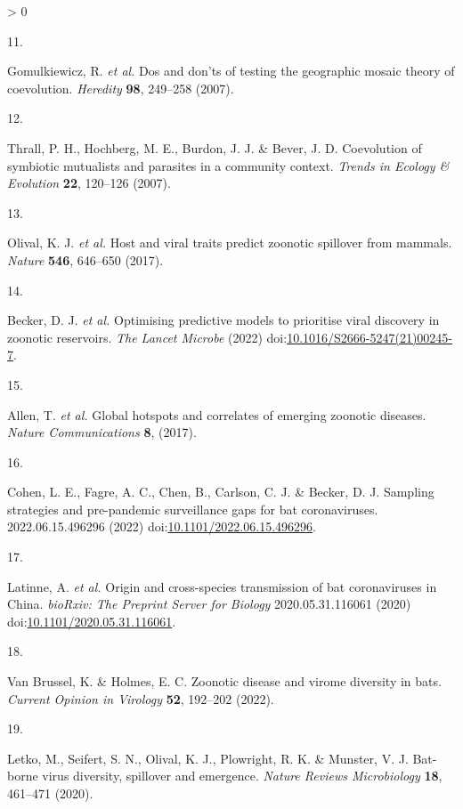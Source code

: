 \documentclass[11pt]{article}
\newlength{\cslhangindent}
\newlength{\csllabelwidth}
\newenvironment{CSLReferences}[3] %
 {%
  \setlength{\parindent}{0pt}
  \ifodd #1 \everypar{\setlength{\hangindent}{\cslhangindent}}\ignorespaces\fi
  \ifnum #2 > 0
  \setlength{\parskip}{#2\baselineskip}
  \fi
 }%
 {}
\newcommand{\CSLLeftMargin}[1]{\parbox[t]{\maxof{\widthof{#1}}{\csllabelwidth}}{#1}}
\newcommand{\CSLRightInline}[1]{\parbox[t]{\linewidth}{#1}}
\begin{document}
\begin{CSLReferences}{0}{0}
\leavevmode\hypertarget{ref-Gomulkiewicz2007DosDon}{}%
\CSLLeftMargin{11. }
\CSLRightInline{Gomulkiewicz, R. \emph{et al.} Dos and don'ts of testing
the geographic mosaic theory of coevolution. \emph{Heredity}
\textbf{98}, 249--258 (2007).}

\leavevmode\hypertarget{ref-Thrall2007CoeSym}{}%
\CSLLeftMargin{12. }
\CSLRightInline{Thrall, P. H., Hochberg, M. E., Burdon, J. J. \& Bever,
J. D. Coevolution of symbiotic mutualists and parasites in a community
context. \emph{Trends in Ecology \& Evolution} \textbf{22}, 120--126
(2007).}

\leavevmode\hypertarget{ref-Olival2017HosVir}{}%
\CSLLeftMargin{13. }
\CSLRightInline{Olival, K. J. \emph{et al.} Host and viral traits
predict zoonotic spillover from mammals. \emph{Nature} \textbf{546},
646--650 (2017).}

\leavevmode\hypertarget{ref-Becker2022OptPre}{}%
\CSLLeftMargin{14. }
\CSLRightInline{Becker, D. J. \emph{et al.} Optimising predictive models
to prioritise viral discovery in zoonotic reservoirs. \emph{The Lancet
Microbe} (2022)
doi:\href{https://doi.org/10.1016/S2666-5247(21)00245-7}{10.1016/S2666-5247(21)00245-7}.}

\leavevmode\hypertarget{ref-Allen2017GloHot}{}%
\CSLLeftMargin{15. }
\CSLRightInline{Allen, T. \emph{et al.} Global hotspots and correlates
of emerging zoonotic diseases. \emph{Nature Communications} \textbf{8},
(2017).}

\leavevmode\hypertarget{ref-Cohen2022SamStr}{}%
\CSLLeftMargin{16. }
\CSLRightInline{Cohen, L. E., Fagre, A. C., Chen, B., Carlson, C. J. \&
Becker, D. J. Sampling strategies and pre-pandemic surveillance gaps for
bat coronaviruses. 2022.06.15.496296 (2022)
doi:\href{https://doi.org/10.1101/2022.06.15.496296}{10.1101/2022.06.15.496296}.}

\leavevmode\hypertarget{ref-Latinne2020OriCro}{}%
\CSLLeftMargin{17. }
\CSLRightInline{Latinne, A. \emph{et al.} Origin and cross-species
transmission of bat coronaviruses in China. \emph{bioRxiv: The Preprint
Server for Biology} 2020.05.31.116061 (2020)
doi:\href{https://doi.org/10.1101/2020.05.31.116061}{10.1101/2020.05.31.116061}.}

\leavevmode\hypertarget{ref-VanBrussel2022ZooDis}{}%
\CSLLeftMargin{18. }
\CSLRightInline{Van Brussel, K. \& Holmes, E. C. Zoonotic disease and
virome diversity in bats. \emph{Current Opinion in Virology}
\textbf{52}, 192--202 (2022).}

\leavevmode\hypertarget{ref-Letko2020BatVir}{}%
\CSLLeftMargin{19. }
\CSLRightInline{Letko, M., Seifert, S. N., Olival, K. J., Plowright, R.
K. \& Munster, V. J. Bat-borne virus diversity, spillover and emergence.
\emph{Nature Reviews Microbiology} \textbf{18}, 461--471 (2020).}


\end{CSLReferences}
\end{document}
